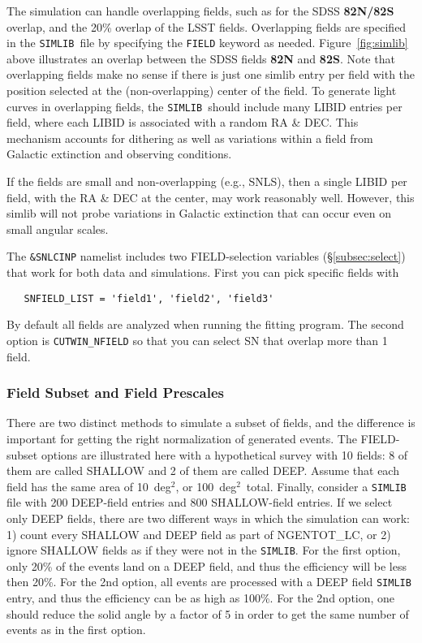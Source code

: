 \documentclass[12pt]{article}
\newcommand{\simlib}{{\tt SIMLIB}}
\newcommand{\degsq}{deg$^2$}
\begin{document}
{The simulation can handle overlapping fields, 
such as for the SDSS {\bf 82N/82S} overlap, 
and the 20\% overlap of the LSST fields.
Overlapping fields are specified in the \simlib\ file by
specifying the {\tt FIELD} keyword as needed.
Figure~\ref{fig:simlib} above illustrates an overlap between 
the SDSS fields  {\bf 82N} and {\bf 82S}. 
Note that overlapping fields make no sense if there is just 
one simlib entry per field with the position selected at the
(non-overlapping) center of the field. 
To generate light curves in overlapping fields,
the \simlib\ should include many LIBID entries per field,
where each LIBID is associated with a random RA \& DEC.
This mechanism accounts for dithering as well as variations
within a field from Galactic extinction and observing conditions.


If the fields are small and non-overlapping (e.g., SNLS),
then a single LIBID per field, with the RA \& DEC at the center,
may work reasonably well. However, this simlib will not probe
variations in Galactic extinction that can occur even on
small angular scales.


The {\tt \&SNLCINP} namelist includes two FIELD-selection variables
(\S\ref{subsec:select})
that work for both data and simulations.
First you can pick specific fields with
\begin{verbatim}
   SNFIELD_LIST = 'field1', 'field2', 'field3'
\end{verbatim}
By default all fields are analyzed when running the fitting program.
The second option is {\tt CUTWIN\_NFIELD} so that you can select
SN that overlap more than 1 field.


 \subsubsection{Field Subset and Field Prescales}
 \label{sss:field_subset}

There are two distinct methods to simulate a subset of fields,
and the difference is important for getting the right normalization
of generated events.
The FIELD-subset options are illustrated here with a hypothetical survey 
with 10 fields: 8 of them are called SHALLOW and 2 of them are called DEEP.
Assume that each field has the same area of 10~\degsq, or 100~\degsq\ total.
Finally, consider a {\tt SIMLIB} file with 200 DEEP-field entries and 800
SHALLOW-field entries.
If we select only DEEP fields, there are two different ways in 
which the simulation can work: 1) count every SHALLOW and DEEP field
as part of {NGENTOT\_LC}, or 2) ignore SHALLOW fields as if they
were not in the {\tt SIMLIB}.  For the first option, only 20\%
of the events land on a DEEP field, and thus the efficiency will
be less then 20\%. For the 2nd option, all events are processed
with a DEEP field {\tt SIMLIB} entry, and thus the efficiency
can be as high as 100\%. For the 2nd option, one should reduce
the solid angle by a factor of 5 in order to get the same
number of events as in the first option.

}
\end{document}
